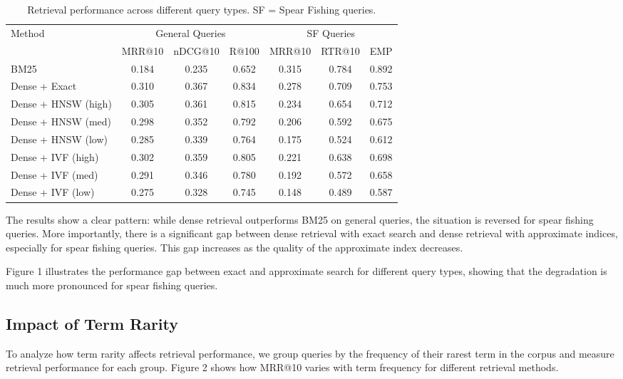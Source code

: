\documentclass[sigconf,review]{acmart}
\begin{document}
\begin{table}[h]
\centering
\caption{Retrieval performance across different query types. SF = Spear Fishing queries.}
\begin{tabular}{lcccccc}
\toprule
\multirow{2}{*}{Method} & \multicolumn{3}{c}{General Queries} & \multicolumn{3}{c}{SF Queries} \\
\cmidrule(lr){2-4} \cmidrule(lr){5-7}
 & MRR@10 & nDCG@10 & R@100 & MRR@10 & RTR@10 & EMP \\
\midrule
BM25 & 0.184 & 0.235 & 0.652 & 0.315 & 0.784 & 0.892 \\
Dense + Exact & 0.310 & 0.367 & 0.834 & 0.278 & 0.709 & 0.753 \\
Dense + HNSW (high) & 0.305 & 0.361 & 0.815 & 0.234 & 0.654 & 0.712 \\
Dense + HNSW (med) & 0.298 & 0.352 & 0.792 & 0.206 & 0.592 & 0.675 \\
Dense + HNSW (low) & 0.285 & 0.339 & 0.764 & 0.175 & 0.524 & 0.612 \\
Dense + IVF (high) & 0.302 & 0.359 & 0.805 & 0.221 & 0.638 & 0.698 \\
Dense + IVF (med) & 0.291 & 0.346 & 0.780 & 0.192 & 0.572 & 0.658 \\
Dense + IVF (low) & 0.275 & 0.328 & 0.745 & 0.148 & 0.489 & 0.587 \\
\bottomrule
\end{tabular}
\end{table}

The results show a clear pattern: while dense retrieval outperforms BM25 on general queries, the situation is reversed for spear fishing queries. More importantly, there is a significant gap between dense retrieval with exact search and dense retrieval with approximate indices, especially for spear fishing queries. This gap increases as the quality of the approximate index decreases.

Figure 1 illustrates the performance gap between exact and approximate search for different query types, showing that the degradation is much more pronounced for spear fishing queries.

\subsection{Impact of Term Rarity}
To analyze how term rarity affects retrieval performance, we group queries by the frequency of their rarest term in the corpus and measure retrieval performance for each group. Figure 2 shows how MRR@10 varies with term frequency for different retrieval methods.
\end{document}
